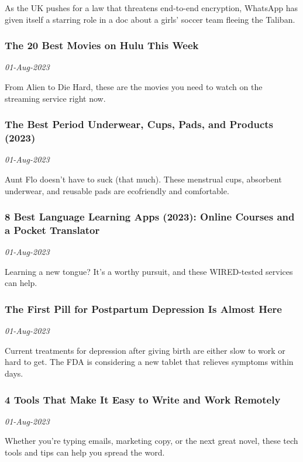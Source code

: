 As the UK pushes for a law that threatens end-to-end encryption, WhatsApp has given itself a starring role in a doc about a girls’ soccer team fleeing the Taliban.
\subsubsection{The 20 Best Movies on Hulu This Week \href{https://www.wired.com/story/best-movies-hulu-right-now/}{}}
\textit{01-Aug-2023}

From Alien to Die Hard, these are the movies you need to watch on the streaming service right now.
\subsubsection{The Best Period Underwear, Cups, Pads, and Products (2023) \href{https://www.wired.com/story/best-menstrual-products/}{}}
\textit{01-Aug-2023}

Aunt Flo doesn’t have to suck (that much). These menstrual cups, absorbent underwear, and reusable pads are ecofriendly and comfortable.
\subsubsection{8 Best Language Learning Apps (2023): Online Courses and a Pocket Translator \href{https://www.wired.com/gallery/best-language-learning-apps/}{}}
\textit{01-Aug-2023}

Learning a new tongue? It’s a worthy pursuit, and these WIRED-tested services can help.
\subsubsection{The First Pill for Postpartum Depression Is Almost Here \href{https://www.wired.com/story/the-first-pill-for-postpartum-depression-is-almost-here/}{}}
\textit{01-Aug-2023}

Current treatments for depression after giving birth are either slow to work or hard to get. The FDA is considering a new tablet that relieves symptoms within days.
\subsubsection{4 Tools That Make It Easy to Write and Work Remotely \href{https://www.wired.com/story/4-tools-tips-easy-write-work-remotely/}{}}
\textit{01-Aug-2023}

Whether you’re typing emails, marketing copy, or the next great novel, these tech tools and tips can help you spread the word.
